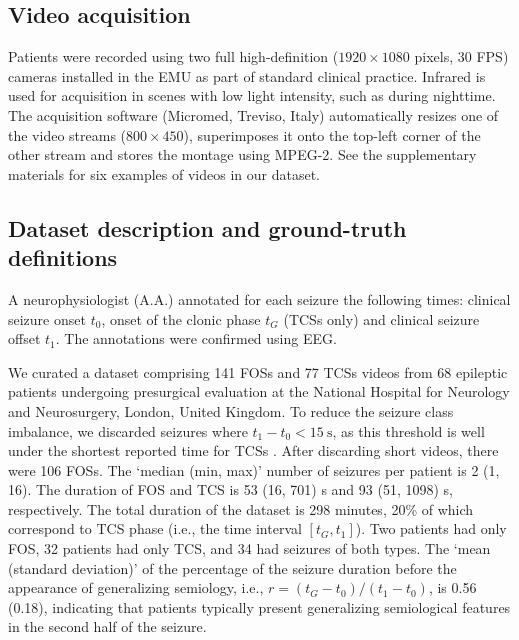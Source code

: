 \subsection{Video acquisition}

Patients were recorded using two full high-definition ($1920 \times 1080$ pixels, 30 \ac{FPS}) cameras installed in the \ac{EMU} as part of standard clinical practice.
Infrared is used for acquisition in scenes with low light intensity, such as during nighttime.
The acquisition software (Micromed, Treviso, Italy) automatically resizes one of the video streams ($800 \times 450$), superimposes it onto the top-left corner of the other stream and stores the montage using MPEG-2.
See the supplementary materials for six examples of videos in our dataset.

\subsection{Dataset description and ground-truth definitions}
\label{sec:dataset}

A neurophysiologist (A.A.) annotated for each seizure the following times: clinical seizure onset $t_0$, onset of the clonic phase $t_G$ (\acp{TCS} only) and clinical seizure offset $t_1$.
The annotations were confirmed using \ac{EEG}.

We curated a dataset comprising 141 \acp{FOS} and 77 \acp{TCS} videos from 68 epileptic patients undergoing presurgical evaluation at the National Hospital for Neurology and Neurosurgery, London, United Kingdom.
To reduce the seizure class imbalance, we discarded seizures where $t_1 - t_0 < \SI{15}{\second}$, as this threshold is well under the shortest reported time for \acp{TCS} \cite{jenssen_how_2006}.
After discarding short videos,
there were 106 \acp{FOS}.
The `median (min, max)' number of seizures per patient is 2 (1, 16).
The duration of \ac{FOS} and \ac{TCS} is 53 (16, 701) s and 93 (51, 1098) s, respectively.
The total duration of the dataset is 298 minutes, 20\% of which correspond to \ac{TCS} phase (i.e., the time interval $[t_G, t_1]$).
Two patients had only \ac{FOS}, 32 patients had only \ac{TCS}, and 34 had seizures of both types.
The `mean (standard deviation)' of the percentage of the seizure duration before the appearance of generalizing semiology, i.e., $r = (t_G - t_0) / (t_1 - t_0)$, is 0.56 (0.18), indicating that patients typically present generalizing semiological features in the second half of the seizure.


